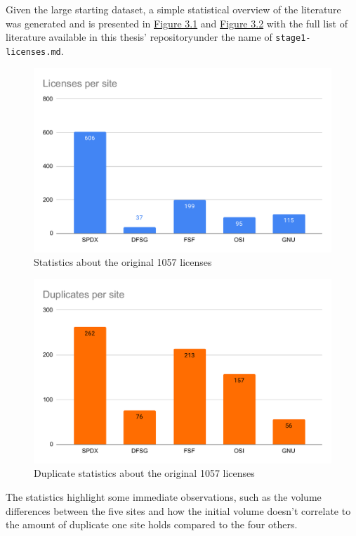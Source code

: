 Given the large starting dataset, a simple statistical overview of the literature was generated and is presented in \hyperref[fig:3-1]{Figure 3.1} and \hyperref[fig:3-2]{Figure 3.2} with the full list of literature available in this thesis' repository\footnotemark[1] under the name of \texttt{stage1-licenses.md}.
\begin{figure}
	\centering
	\includegraphics[scale=0.76]{figures/figure-3-1.pdf}
	\caption{Statistics about the original 1057 licenses}
	\label{fig:3-1}
\end{figure}
\begin{figure}
	\centering
	\includegraphics[scale=0.76]{figures/figure-3-2.pdf}
	\caption{Duplicate statistics about the original 1057 licenses}
	\label{fig:3-2}
\end{figure}
The statistics highlight some immediate observations, such as the volume differences between the five sites and how the initial volume doesn't correlate to the amount of duplicate one site holds compared to the four others.

